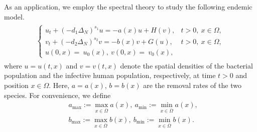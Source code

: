 \documentclass[a4paper,11pt]{amsart}
\theoremstyle{definition}
\def\O{\Omega}
\numberwithin{equation}{section}
\theoremstyle{definition}
\def\O{\Omega}
\begin{document}
\phantom{1}


As an application, we employ the spectral theory to study the following endemic model.
\begin{align}\label{eq:main}
\begin{split}
\left\{\begin{array}{lllll}
u_t +(-d_1\Delta_N)^{s_1}u=-a(x)u+H(v),&t>0,~x\in \O, \\
v_t+(-d_2\Delta_N)^{s_2}v=-b(x)v+G(u),&t>0,~x\in \O, \\
u(0,x) = \ u_0(x),\ 
v(0,x) = \ v_0(x),
\end{array}\right.
\end{split}
\end{align}
where $u=u(t,x)$ and $v=v(t,x)$ denote the spatial densities of the bacterial population 
and the infective human population, respectively, at time $t>0$ and position $x \in \Omega$. Here,  $a=a(x)$, $b=b(x)$ are the removal rates of the two species.  For convenience, we define
\begin{align*}
&a_{\max}:=\max_{x\in \overline{\O}}a(x),~a_{\min}:=\min_{x\in \overline{\O}}a(x),\\
&b_{\max}:=\max_{x\in \overline{\O}}b(x),~b_{\min}:=\min_{x\in \overline{\O}}b(x).
\end{align*}

\end{document}
